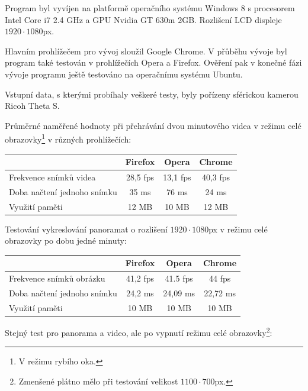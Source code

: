 Program byl vyvíjen na platformě operačního systému Windows 8 s procesorem Intel Core i7 2.4 GHz a GPU Nvidia GT 630m 2GB. Rozlišení LCD displeje $1920 \cdot 1080$px. 

Hlavním prohlížečem pro vývoj sloužil Google Chrome. V přůběhu vývoje byl program také testován v prohlížečích Opera a Firefox. Ověření pak v konečné fázi vývoje programu ještě testováno na operačnímu systému Ubuntu.

Vstupní data, s kterými probíhaly veškeré testy, byly pořízeny sférickou kamerou Ricoh Theta S.

Průměrné naměřené hodnoty při přehrávání dvou minutového videa v režimu celé obrazovky\footnote{V režimu rybího oka.} v různých prohlížečích: 

\begin{center}
	\begin{tabular}{ l | c| c| c  } 
		& \textbf{Firefox} & \textbf{Opera}  & \textbf{Chrome}   \\ 
 		\hline
		Frekvence snímků videa & 28,5 fps & 13,1 fps & 40,3 fps    \\ 
		\hline
		Doba načtení jednoho snímku  & 35 ms & 76 ms & 24 ms  \\ 
		\hline
		Využití paměti & 12  MB & 10  MB & 12  MB   \\ 
		
	\end{tabular}
\end{center}

Testování vykreslování panoramat o rozlišení $1920 \cdot 1080$px v režimu celé obrazovky po dobu jedné minuty:

\begin{center}
	\begin{tabular}{ l | c| c| c  } 
		& \textbf{Firefox} & \textbf{Opera}  & \textbf{Chrome}   \\ 
		\hline
		Frekvence snímků obrázku & 41,2 fps & 41.5 fps & 44 fps    \\ 
		\hline
		Doba načtení jednoho snímku  & 24,2 ms & 24,09 ms & 22,72 ms  \\ 
		\hline
		Využití paměti & 10  MB & 10  MB & 10  MB   \\ 
		
	\end{tabular}
\end{center}

\newpage

Stejný test pro panorama a video, ale po vypnutí režimu celé obrazovky\footnote{Zmenšené plátno mělo při testování velikost $1100 \cdot 700$px.}:

